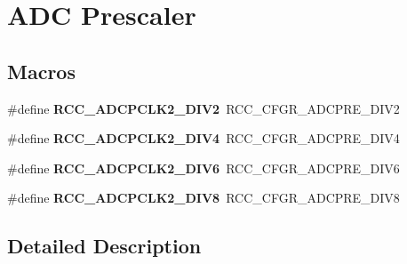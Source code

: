 \hypertarget{group___r_c_c_ex___a_d_c___prescaler}{}\section{A\+DC Prescaler}
\label{group___r_c_c_ex___a_d_c___prescaler}
\subsection*{Macros}
\begin{DoxyCompactItemize}
\item 
\mbox{\label{group___r_c_c_ex___a_d_c___prescaler_gabf0c62e72916675e7a7fb4d1ff6daa17}} 
\#define {\bfseries R\+C\+C\+\_\+\+A\+D\+C\+P\+C\+L\+K2\+\_\+\+D\+I\+V2}~R\+C\+C\+\_\+\+C\+F\+G\+R\+\_\+\+A\+D\+C\+P\+R\+E\+\_\+\+D\+I\+V2
\item 
\mbox{\label{group___r_c_c_ex___a_d_c___prescaler_ga8faad39ce8c436a2db1b0c26e27ee5c3}} 
\#define {\bfseries R\+C\+C\+\_\+\+A\+D\+C\+P\+C\+L\+K2\+\_\+\+D\+I\+V4}~R\+C\+C\+\_\+\+C\+F\+G\+R\+\_\+\+A\+D\+C\+P\+R\+E\+\_\+\+D\+I\+V4
\item 
\mbox{\label{group___r_c_c_ex___a_d_c___prescaler_gac487ed2d7f4c9d67b72c847ae2a2e292}} 
\#define {\bfseries R\+C\+C\+\_\+\+A\+D\+C\+P\+C\+L\+K2\+\_\+\+D\+I\+V6}~R\+C\+C\+\_\+\+C\+F\+G\+R\+\_\+\+A\+D\+C\+P\+R\+E\+\_\+\+D\+I\+V6
\item 
\mbox{\label{group___r_c_c_ex___a_d_c___prescaler_gaabcb60850e93dcba0a166361166eecaf}} 
\#define {\bfseries R\+C\+C\+\_\+\+A\+D\+C\+P\+C\+L\+K2\+\_\+\+D\+I\+V8}~R\+C\+C\+\_\+\+C\+F\+G\+R\+\_\+\+A\+D\+C\+P\+R\+E\+\_\+\+D\+I\+V8
\end{DoxyCompactItemize}


\subsection{Detailed Description}
